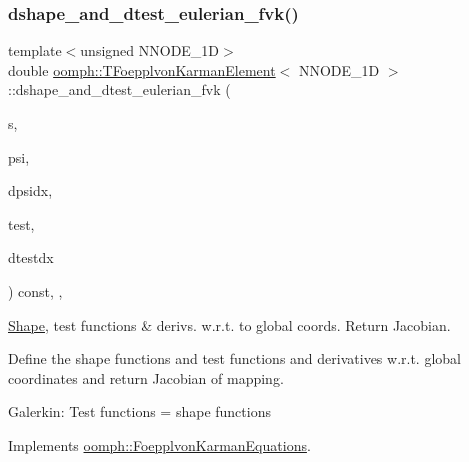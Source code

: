 \mbox{\label{classoomph_1_1TFoepplvonKarmanElement_aee55fcd80bf4f6ea2550a43216e8e1c0}} 
\subsubsection{\texorpdfstring{dshape\+\_\+and\+\_\+dtest\+\_\+eulerian\+\_\+fvk()}{dshape\_and\_dtest\_eulerian\_fvk()}}
{\footnotesize\ttfamily template$<$unsigned N\+N\+O\+D\+E\+\_\+1D$>$ \\
double \hyperlink{classoomph_1_1TFoepplvonKarmanElement}{oomph\+::\+T\+Foepplvon\+Karman\+Element}$<$ N\+N\+O\+D\+E\+\_\+1D $>$\+::dshape\+\_\+and\+\_\+dtest\+\_\+eulerian\+\_\+fvk (\begin{DoxyParamCaption}\item[{const \hyperlink{classoomph_1_1Vector}{Vector}$<$ double $>$ \&}]{s,  }\item[{\hyperlink{classoomph_1_1Shape}{Shape} \&}]{psi,  }\item[{\hyperlink{classoomph_1_1DShape}{D\+Shape} \&}]{dpsidx,  }\item[{\hyperlink{classoomph_1_1Shape}{Shape} \&}]{test,  }\item[{\hyperlink{classoomph_1_1DShape}{D\+Shape} \&}]{dtestdx }\end{DoxyParamCaption}) const\hspace{0.3cm}{\ttfamily [inline]}, {\ttfamily [protected]}, {\ttfamily [virtual]}}



\hyperlink{classoomph_1_1Shape}{Shape}, test functions \& derivs. w.\+r.\+t. to global coords. Return Jacobian. 

Define the shape functions and test functions and derivatives w.\+r.\+t. global coordinates and return Jacobian of mapping.

Galerkin\+: Test functions = shape functions 

Implements \hyperlink{classoomph_1_1FoepplvonKarmanEquations_a59a391262fa8c5ae6313db65cf682ee2}{oomph\+::\+Foepplvon\+Karman\+Equations}.



